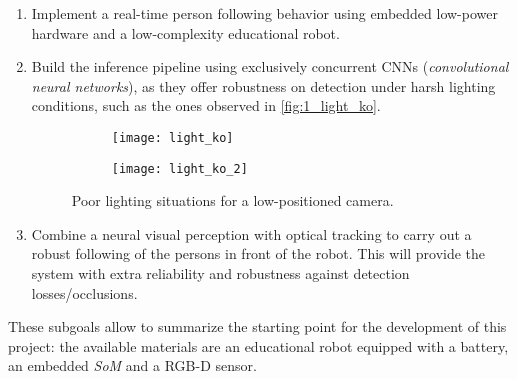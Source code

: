 	\begin{enumerate}
		\item Implement a real-time person following behavior using embedded low-power hardware and a low-complexity educational robot.
		
		\item Build the inference pipeline using exclusively concurrent CNNs (\textit{convolutional neural networks}), as they offer robustness on detection under harsh lighting conditions, such as the ones observed in \autoref{fig:1_light_ko}.
		
		\begin{figure}[h]
			\centering
			\begin{subfigure}[b]{0.3\linewidth}
				\centering
				\texttt{[image: light\_ko]}
			\end{subfigure}
			\hfill
			\begin{subfigure}[b]{0.5\linewidth}
				\centering
				\texttt{[image: light\_ko\_2]}
			\end{subfigure}		
			
			\caption{Poor lighting situations for a low-positioned camera.}
			\label{fig:1_light_ko}
		\end{figure}
		
		
		\item Combine a neural visual perception with optical tracking to carry out a robust following of the persons in front of the robot. This will provide the system with extra reliability and robustness against detection losses/occlusions.
	\end{enumerate}
	
These subgoals allow to summarize the starting point for the development of this project: the available materials are an educational robot equipped with a battery, an embedded \textit{SoM} and a RGB-D sensor.\\


